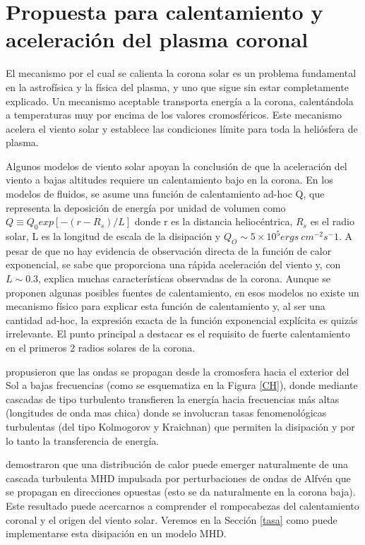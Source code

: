 \documentclass[a4paper,11pt]{report}
\begin{document}
\section{Propuesta para calentamiento y aceleración del plasma coronal}

El mecanismo por el cual se calienta la corona solar es un problema fundamental en la astrofísica y la física del plasma, y uno que sigue sin estar completamente explicado. Un mecanismo aceptable transporta energía a la corona, calentándola a temperaturas muy por encima de los valores cromosféricos. Este mecanismo acelera el viento solar y establece las condiciones límite para toda la heliósfera de plasma. %

Algunos modelos de viento solar apoyan la conclusión de que la aceleración del viento a bajas altitudes requiere un calentamiento bajo en la corona. En los modelos de fluidos, se asume una función de calentamiento ad-hoc Q, que representa la deposición de energía por unidad de volumen como $Q\equiv Q_0 exp[-(r-R_s)/L]$ donde r es la distancia heliocéntrica, $R_s$ es el radio solar, L es la longitud de escala de la disipación y $Q_O \sim 5\times 10^5 ergs ~cm^{-2}s^-1$. A pesar de que no hay evidencia de observación directa de la función de calor exponencial, se sabe que proporciona una rápida aceleración del viento y, con $L \sim 0.3$, explica muchas características observadas de la corona. Aunque se proponen algunas posibles fuentes de calentamiento, en esos modelos no existe un mecanismo físico para explicar esta función de calentamiento y, al ser una cantidad ad-hoc, la expresión exacta de la función exponencial explícita es quizás irrelevante. El punto principal a destacar es el requisito de fuerte calentamiento en el primeros 2 radios solares de la corona. 

\citet{hollweg_1986} propusieron que las ondas se propagan desde la cromosfera hacia el exterior del Sol a bajas frecuencias (como se esquematiza en la Figura \ref{CH}), donde mediante cascadas de tipo turbulento transfieren la energía hacia frecuencias más altas (longitudes de onda mas chica) donde se involucran tasas fenomenológicas turbulentas (del tipo Kolmogorov y Kraichnan) que permiten la disipación y por lo tanto la transferencia de energía.

\citet{dmitruk_2002} demostraron que una distribución de calor puede emerger naturalmente de una cascada turbulenta MHD impulsada por perturbaciones de ondas de Alfvén que se propagan en direcciones opuestas (esto se da naturalmente en la corona baja). Este resultado puede acercarnos a comprender el rompecabezas del calentamiento coronal y el origen del viento solar. Veremos en la Sección \ref{tasa} como puede implementarse esta disipación en un modelo MHD.
\end{document}
